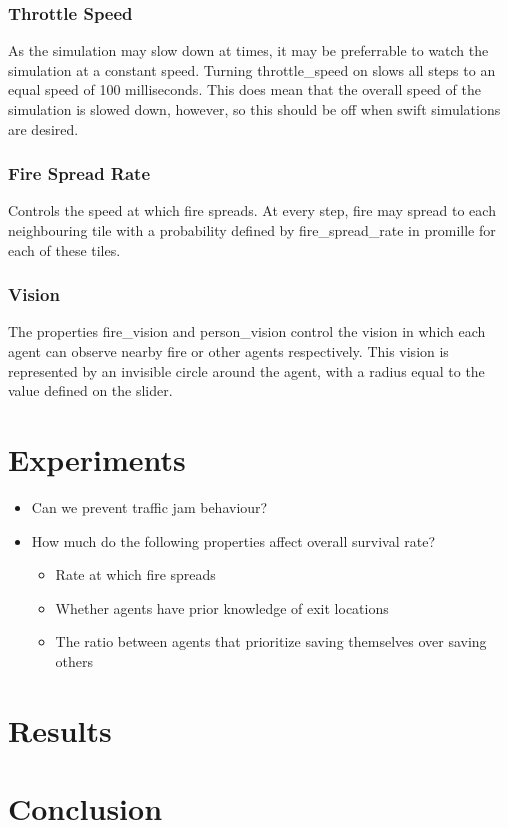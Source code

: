 \documentclass[a4paper]{article}
\begin{document}
\subsubsection{Throttle Speed}
As the simulation may slow down at times, it may be preferrable to watch the simulation at a constant speed. Turning throttle\_speed on slows all steps to an equal speed of 100 milliseconds. This does mean that the overall speed of the simulation is slowed down, however, so this should be off when swift simulations are desired.

\subsubsection{Fire Spread Rate}
Controls the speed at which fire spreads. At every step, fire may spread to each neighbouring tile with a probability defined by fire\_spread\_rate in promille for each of these tiles.

\subsubsection{Vision}
The properties fire\_vision and person\_vision control the vision in which each agent can observe nearby fire or other agents respectively. This vision is represented by an invisible circle around the agent, with a radius equal to the value defined on the slider.

\FloatBarrier
\section{Experiments}
\begin{itemize}
\item Can we prevent traffic jam behaviour?
\item How much do the following properties affect overall survival rate?
\begin{itemize}
\item Rate at which fire spreads
\item Whether agents have prior knowledge of exit locations
\item The ratio between agents that prioritize saving themselves over saving others
\end{itemize}
\end{itemize}

\section{Results}

\section{Conclusion}
\end{document}
